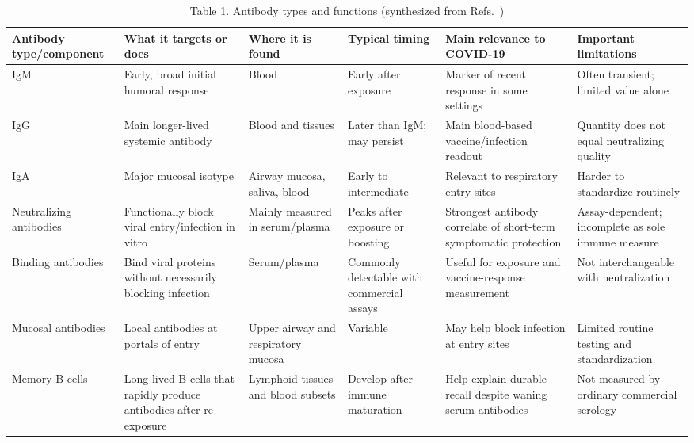 \documentclass[12pt]{article}
\begin{document}
\begin{table}[H]
\centering
\caption{Table 1. Antibody types and functions (synthesized from Refs.~\cite{ref3,ref4,ref5})}
\begin{tabularx}{\textwidth}{>{\raggedright\arraybackslash}p{2.2cm} >{\raggedright\arraybackslash}X >{\raggedright\arraybackslash}p{2.0cm} >{\raggedright\arraybackslash}p{1.9cm} >{\raggedright\arraybackslash}X >{\raggedright\arraybackslash}p{2.3cm}}
\toprule
Antibody type/component & What it targets or does & Where it is found & Typical timing & Main relevance to COVID-19 & Important limitations \\
\midrule
IgM & Early, broad initial humoral response & Blood & Early after exposure & Marker of recent response in some settings & Often transient; limited value alone \\
IgG & Main longer-lived systemic antibody & Blood and tissues & Later than IgM; may persist & Main blood-based vaccine/infection readout & Quantity does not equal neutralizing quality \\
IgA & Major mucosal isotype & Airway mucosa, saliva, blood & Early to intermediate & Relevant to respiratory entry sites & Harder to standardize routinely \\
Neutralizing antibodies & Functionally block viral entry/infection in vitro & Mainly measured in serum/plasma & Peaks after exposure or boosting & Strongest antibody correlate of short-term symptomatic protection & Assay-dependent; incomplete as sole immune measure \\
Binding antibodies & Bind viral proteins without necessarily blocking infection & Serum/plasma & Commonly detectable with commercial assays & Useful for exposure and vaccine-response measurement & Not interchangeable with neutralization \\
Mucosal antibodies & Local antibodies at portals of entry & Upper airway and respiratory mucosa & Variable & May help block infection at entry sites & Limited routine testing and standardization \\
Memory B cells & Long-lived B cells that rapidly produce antibodies after re-exposure & Lymphoid tissues and blood subsets & Develop after immune maturation & Help explain durable recall despite waning serum antibodies & Not measured by ordinary commercial serology \\
\bottomrule
\end{tabularx}
\end{table}
\end{document}

